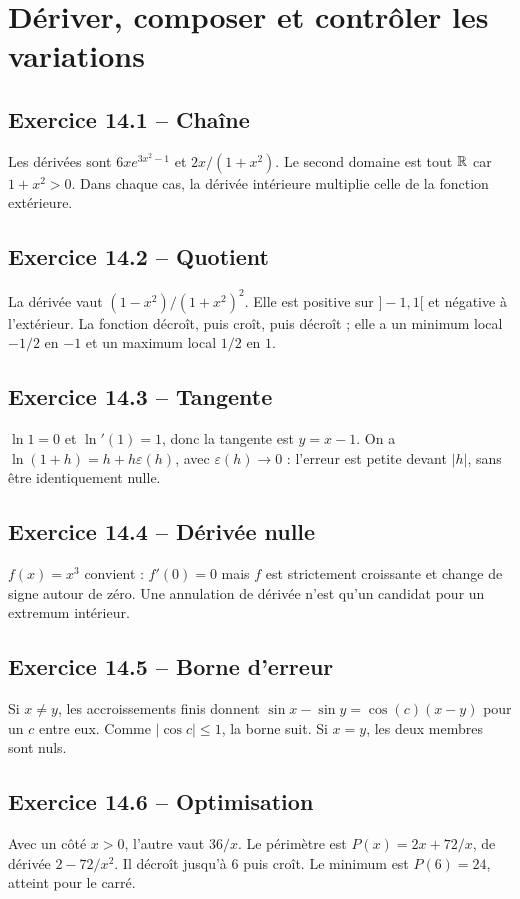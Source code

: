 \chapter{Dériver, composer et contrôler les variations}
\section*{Exercice 14.1 -- Chaîne}
Les dérivées sont $6xe^{3x^2-1}$ et $2x/(1+x^2)$. Le second domaine est tout $\mathbb{R}$ car $1+x^2>0$. Dans chaque cas, la dérivée intérieure multiplie celle de la fonction extérieure.

\section*{Exercice 14.2 -- Quotient}
La dérivée vaut $(1-x^2)/(1+x^2)^2$. Elle est positive sur $]-1,1[$ et négative à l'extérieur. La fonction décroît, puis croît, puis décroît ; elle a un minimum local $-1/2$ en $-1$ et un maximum local $1/2$ en $1$.

\section*{Exercice 14.3 -- Tangente}
$\ln1=0$ et $\ln'(1)=1$, donc la tangente est $y=x-1$. On a $\ln(1+h)=h+h\varepsilon(h)$, avec $\varepsilon(h)\to0$ : l'erreur est petite devant $|h|$, sans être identiquement nulle.

\section*{Exercice 14.4 -- Dérivée nulle}
$f(x)=x^3$ convient : $f'(0)=0$ mais $f$ est strictement croissante et change de signe autour de zéro. Une annulation de dérivée n'est qu'un candidat pour un extremum intérieur.

\section*{Exercice 14.5 -- Borne d’erreur}
Si $x\ne y$, les accroissements finis donnent $\sin x-\sin y=\cos(c)(x-y)$ pour un $c$ entre eux. Comme $|\cos c|\le1$, la borne suit. Si $x=y$, les deux membres sont nuls.

\section*{Exercice 14.6 -- Optimisation}
Avec un côté $x>0$, l'autre vaut $36/x$. Le périmètre est $P(x)=2x+72/x$, de dérivée $2-72/x^2$. Il décroît jusqu'à $6$ puis croît. Le minimum est $P(6)=24$, atteint pour le carré.
